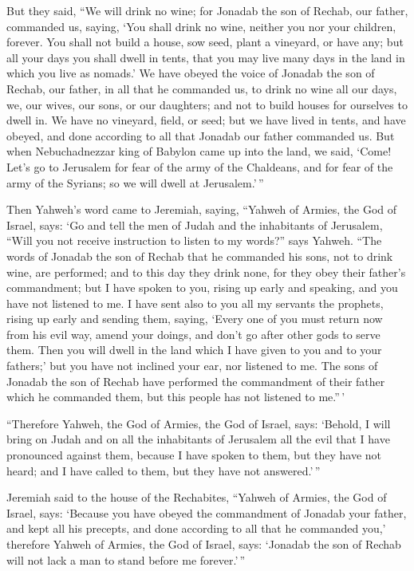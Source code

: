  But they said, ``We will drink no wine; for Jonadab the
son of Rechab, our father, commanded us, saying, `You shall drink no
wine, neither you nor your children, forever.  You shall
not build a house, sow seed, plant a vineyard, or have any; but all your
days you shall dwell in tents, that you may live many days in the land
in which you live as nomads.'  We have obeyed the voice of
Jonadab the son of Rechab, our father, in all that he commanded us, to
drink no wine all our days, we, our wives, our sons, or our daughters;
 and not to build houses for ourselves to dwell in. We
have no vineyard, field, or seed;  but we have lived in
tents, and have obeyed, and done according to all that Jonadab our
father commanded us.  But when Nebuchadnezzar king of
Babylon came up into the land, we said, `Come! Let's go to Jerusalem for
fear of the army of the Chaldeans, and for fear of the army of the
Syrians; so we will dwell at Jerusalem.'\,''

 Then Yahweh's word came to Jeremiah, saying,
 ``Yahweh of Armies, the God of Israel, says: `Go and
tell the men of Judah and the inhabitants of Jerusalem, ``Will you not
receive instruction to listen to my words?'' says Yahweh.
 ``The words of Jonadab the son of Rechab that he
commanded his sons, not to drink wine, are performed; and to this day
they drink none, for they obey their father's commandment; but I have
spoken to you, rising up early and speaking, and you have not listened
to me.  I have sent also to you all my servants the
prophets, rising up early and sending them, saying, `Every one of you
must return now from his evil way, amend your doings, and don't go after
other gods to serve them. Then you will dwell in the land which I have
given to you and to your fathers;' but you have not inclined your ear,
nor listened to me.  The sons of Jonadab the son of
Rechab have performed the commandment of their father which he commanded
them, but this people has not listened to me.''\,'

 ``Therefore Yahweh, the God of Armies, the God of
Israel, says: `Behold, I will bring on Judah and on all the inhabitants
of Jerusalem all the evil that I have pronounced against them, because I
have spoken to them, but they have not heard; and I have called to them,
but they have not answered.'\,''

 Jeremiah said to the house of the Rechabites, ``Yahweh
of Armies, the God of Israel, says: `Because you have obeyed the
commandment of Jonadab your father, and kept all his precepts, and done
according to all that he commanded you,'  therefore
Yahweh of Armies, the God of Israel, says: `Jonadab the son of Rechab
will not lack a man to stand before me forever.'\,''

